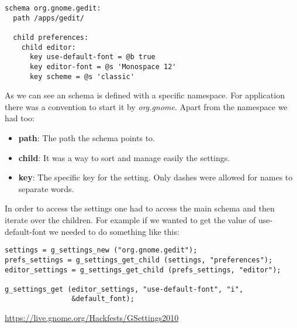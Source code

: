 \begin{lstlisting}[style=GObject]
schema org.gnome.gedit:
  path /apps/gedit/

  child preferences:
    child editor:
      key use-default-font = @b true
      key editor-font = @s 'Monospace 12'
      key scheme = @s 'classic'

\end{lstlisting}

As we can see an schema is defined with a specific namespace. For \GNOME application there was a convention to start it by \emph{org.gnome}. Apart from the namespace we had too:
\begin{itemize}
  \item \textbf{path}: The path the schema points to.
  \item \textbf{child}: It was a way to sort and manage easily the settings.
  \item \textbf{key}: The specific key for the setting. Only dashes were allowed for names to separate words.
\end{itemize}

In order to access the settings one had to access the main schema and then iterate over the children. For example if we wanted to get the value of use-default-font we needed to do something like this:

\begin{lstlisting}[style=GObject]
settings = g_settings_new ("org.gnome.gedit");
prefs_settings = g_settings_get_child (settings, "preferences");
editor_settings = g_settings_get_child (prefs_settings, "editor");

g_settings_get (editor_settings, "use-default-font", "i",
                &default_font);
\end{lstlisting}


\url{https://live.gnome.org/Hackfests/GSettings2010}
